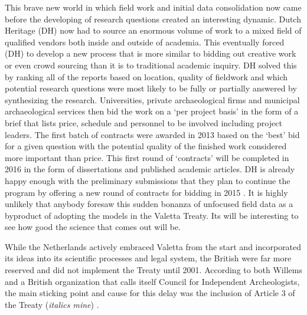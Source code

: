 This brave new world in which field work and initial data consolidation now came before the developing of research questions created an interesting dynamic. Dutch Heritage (DH) now had to source an enormous volume of work to a mixed field of qualified vendors both inside and outside of academia. This eventually forced (DH) to develop a new process that is more similar to bidding out creative work or even crowd sourcing than it is to traditional academic inquiry. DH solved this by ranking all of the reports based on location, quality of fieldwork and which potential research questions were most likely to be fully or partially answered by synthesizing the research. Universities, private archaeological firms and municipal archaeological services then bid the work on a ‘per project basis’ in the form of a brief that lists price, schedule and personnel to be involved including project leaders. 
The first batch of contracts were awarded in 2013 based on the ‘best’ bid for a given question with the potential quality of the finished work considered more important than price. This first round of ‘contracts’ will be completed in 2016 in the form of dissertations and published academic articles. DH is already happy enough with the preliminary submissions that they plan to continue the program by offering a new round of contracts for bidding in 2015 \parencite{Groenewoudt_2014}. 
It is highly unlikely that anybody foresaw this sudden bonanza of unfocused field data as a byproduct of adopting the models in the Valetta Treaty. Its will be interesting to see how good the science that comes out will be. 


While the Netherlands actively embraced Valetta from the start and incorporated its ideas into its scientific processes and legal system, the British were far more reserved and did not implement the Treaty until 2001. According to both Willems and a British organization that calls itself Council for Independent Archeologists, the main sticking point and cause for this delay was the inclusion of Article 3 of the Treaty (\textit{italics mine}) \parencites[62]{Willems_2007}{CIA_2001}. 

